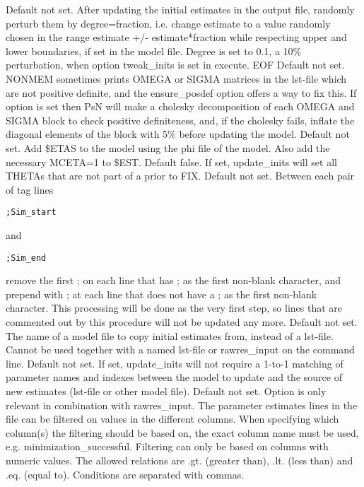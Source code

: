 \begin{optionlist}
\nextopt
{}
Default not set. After updating the initial estimates in the output file, randomly perturb them by degree=fraction, i.e. change estimate to a value	randomly chosen in the range estimate +/- estimate*fraction while respecting upper and lower boundaries, if set in the model file. Degree is set to 0.1, a 10\% perturbation, when option tweak\_inits is set in execute.
EOF
\nextopt
{}
Default not set. NONMEM sometimes prints OMEGA or SIGMA matrices in the lst-file which are not positive definite, and the 
ensure\_posdef option offers a way to fix this. If option is set then PsN will make a cholesky decomposition of each OMEGA and SIGMA block to check positive definiteness, and, if the cholesky fails, inflate the diagonal elements of the block with 5\% before updating the model.
\nextopt
{}
Default not set. Add \$ETAS to the model using the phi file of the model. Also add the necessary MCETA=1 to \$EST.
\nextopt
{}
Default false. If set, update\_inits will set all THETAs that are not part of a prior to FIX. 
\nextopt
\newpage
{}
Default not set. Between each pair of tag lines
\begin{verbatim}
;Sim_start
\end{verbatim}
and
\begin{verbatim}
;Sim_end
\end{verbatim}
remove the first ; on each line that has ; as the first non-blank character, and prepend with ; at each line that does not	have a ; as the first non-blank character. This processing will be done as the very first step, so lines that are commented out by this procedure will not be updated any more.
\nextopt
{}
Default not set. The name of a model file to copy initial estimates from, instead of a lst-file. Cannot be used together with a named lst-file or rawres\_input on the command line.
\nextopt
{}
Default not set. If set, update\_inits will not require a 1-to-1 matching of parameter names and indexes between the model to update and the source of new estimates (lst-file or other model file).
\nextopt
{}
Default not set. Option is only relevant in combination with rawres\_input. The parameter estimates lines in the file can be filtered on values in the different columns. When specifying which column(s) the filtering should be based on, the exact column name must be used, e.g. minimization\_successful. Filtering can only be based on columns with numeric values. The allowed relations are .gt. (greater than), .lt. (less than) and .eq. (equal to). Conditions are separated with commas. \\

\end{optionlist}

